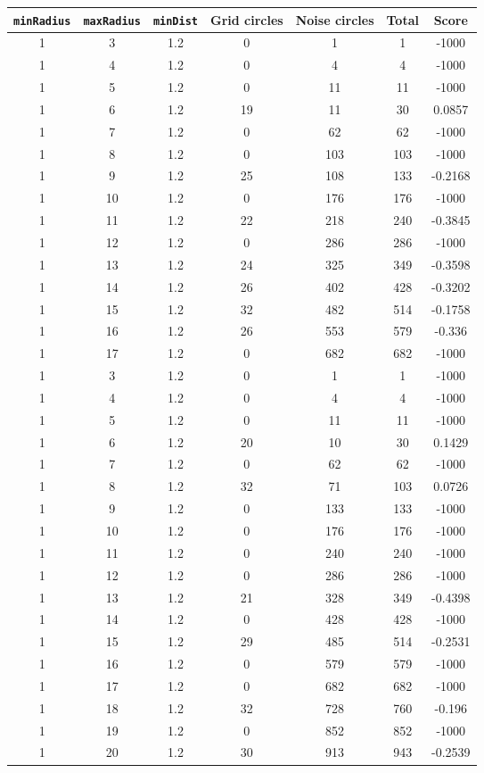 \documentclass[letterpaper, 12pt]{article}
\begin{document}
\begin{longtable}{|c|c|c|c|c|c|c|}
\hline
\textbf{\texttt{minRadius}} & \textbf{\texttt{maxRadius}} & \textbf{\texttt{minDist}} & \textbf{Grid circles} & \textbf{Noise circles} & \textbf{Total} & \textbf{Score} \\
\hline
1 & 3 & 1.2 & 0 & 1 & 1 & -1000 \\
\hline
1 & 4 & 1.2 & 0 & 4 & 4 & -1000 \\
\hline
1 & 5 & 1.2 & 0 & 11 & 11 & -1000 \\
\hline
1 & 6 & 1.2 & 19 & 11 & 30 & 0.0857 \\
\hline
1 & 7 & 1.2 & 0 & 62 & 62 & -1000 \\
\hline
1 & 8 & 1.2 & 0 & 103 & 103 & -1000 \\
\hline
1 & 9 & 1.2 & 25 & 108 & 133 & -0.2168 \\
\hline
1 & 10 & 1.2 & 0 & 176 & 176 & -1000 \\
\hline
1 & 11 & 1.2 & 22 & 218 & 240 & -0.3845 \\
\hline
1 & 12 & 1.2 & 0 & 286 & 286 & -1000 \\
\hline
1 & 13 & 1.2 & 24 & 325 & 349 & -0.3598 \\
\hline
1 & 14 & 1.2 & 26 & 402 & 428 & -0.3202 \\
\hline
1 & 15 & 1.2 & 32 & 482 & 514 & -0.1758 \\
\hline
1 & 16 & 1.2 & 26 & 553 & 579 & -0.336 \\
\hline
1 & 17 & 1.2 & 0 & 682 & 682 & -1000 \\
\hline
1 & 3 & 1.2 & 0 & 1 & 1 & -1000 \\
\hline
1 & 4 & 1.2 & 0 & 4 & 4 & -1000 \\
\hline
1 & 5 & 1.2 & 0 & 11 & 11 & -1000 \\
\hline
1 & 6 & 1.2 & 20 & 10 & 30 & 0.1429 \\
\hline
1 & 7 & 1.2 & 0 & 62 & 62 & -1000 \\
\hline
1 & 8 & 1.2 & 32 & 71 & 103 & 0.0726 \\
\hline
1 & 9 & 1.2 & 0 & 133 & 133 & -1000 \\
\hline
1 & 10 & 1.2 & 0 & 176 & 176 & -1000 \\
\hline
1 & 11 & 1.2 & 0 & 240 & 240 & -1000 \\
\hline
1 & 12 & 1.2 & 0 & 286 & 286 & -1000 \\
\hline
1 & 13 & 1.2 & 21 & 328 & 349 & -0.4398 \\
\hline
1 & 14 & 1.2 & 0 & 428 & 428 & -1000 \\
\hline
1 & 15 & 1.2 & 29 & 485 & 514 & -0.2531 \\
\hline
1 & 16 & 1.2 & 0 & 579 & 579 & -1000 \\
\hline
1 & 17 & 1.2 & 0 & 682 & 682 & -1000 \\
\hline
1 & 18 & 1.2 & 32 & 728 & 760 & -0.196 \\
\hline
1 & 19 & 1.2 & 0 & 852 & 852 & -1000 \\
\hline
1 & 20 & 1.2 & 30 & 913 & 943 & -0.2539 \\
\hline
\end{longtable}
\end{document}
